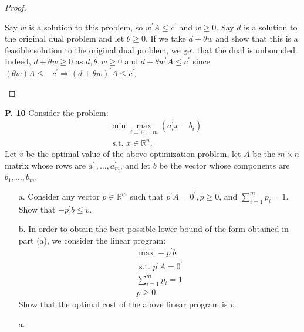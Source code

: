 \documentclass{article}
\begin{document}
\begin{jacklist}
\begin{proof}
\begin{itemize}
                Say $w$ is a solution to this problem, so $w^\prime A \leq c^\prime$ and $w \geq 0$. Say $d$ is a solution 
                to the original dual problem and let $\theta \geq 0$. If we take $d + \theta w$ and show that this is a feasible 
                solution to the original dual problem, we get that the dual is unbounded. Indeed, $d + \theta w \geq 0$ as 
                $d, \theta, w \geq 0$ and $d + \theta w^\prime A \leq c^\prime$ since $(\theta w)A \leq -c^\prime 
                \Rightarrow (d + \theta w)^\prime A \leq c^\prime$.
        \end{itemize} 
    \end{proof}
\newpage
    \begin{framed} 
    \item [\textbf{P. 10}] Consider the problem: 
        \begin{align*}
            & \min \max _{i=1, \ldots, m}\left(a_{i}^{\prime} x-b_{i}\right) \\
            & \text { s.t. } x \in \mathbb{R}^{n} .
        \end{align*} Let $v$ be the optimal value of the above optimization problem, let $A$ be the $m \times n$ matrix whose 
        rows are $a_{1}^{\prime}, \ldots, a_{m}^{\prime}$, and let $b$ be the vector whose components are $b_{1}, \ldots, b_{m}$.
        \begin{itemize}
            \item [a.] Consider any vector $p \in \mathbb{R}^{m}$ such that $p^{\prime} A=0^{\prime}, p \geq 0$, and 
                $\sum_{i=1}^{m} p_{i}=1$. Show that $-p^{\prime} b \leq v$.
            \item [b.] In order to obtain the best possible lower bound of the form obtained in part (a), we consider the linear program:
                \begin{align*}
                    \max -p^{\prime} b \\
                    \text { s.t. } p^{\prime} A=0^{\prime} \\
                    \sum_{i=1}^{m} p_{i}=1 \\
                    p \geq 0.
                \end{align*} 
                Show that the optimal cost of the above linear program is $v$. 
        \end{itemize}
    \end{framed}
    \begin{itemize}
        \item [a.] 

\end{itemize}
\end{jacklist}
\end{document}

